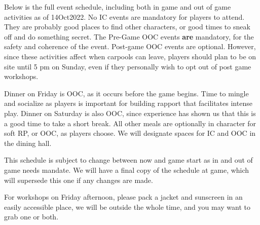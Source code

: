 \documentclass[green]{GL2020}
\begin{document}
\name{\gWeekendSchedule{}}

Below is the full event schedule, including both in game and out of game activities as of 14Oct2022. No IC events are mandatory for players to attend. They are probably good places to find other characters, or good times to sneak off and do something secret. The Pre-Game OOC events \textbf{are} mandatory, for the safety and coherence of the event. Post-game OOC events are optional. However, since these activities affect when carpools can leave, players should plan to be on site until 5 pm on Sunday, even if they personally wish to opt out of post game workshops.

Dinner on Friday is OOC, as it occurs before the game begins. Time to mingle and socialize as players is important for building rapport that facilitates intense play. Dinner on Saturday is also OOC, since experience has shown us that this is a good time to take a short break. All other meals are optionally in character for soft RP, or OOC, as players choose. We will designate spaces for IC and OOC in the dining hall.

This schedule is subject to change between now and game start as in and out of game needs mandate. We will have a final copy of the schedule at game, which will supersede this one if any changes are made.


For workshops on Friday afternoon, please pack a jacket and sunscreen in an easily accessible place, we will be outside the whole time, and you may want to grab one or both.
\end{document}

